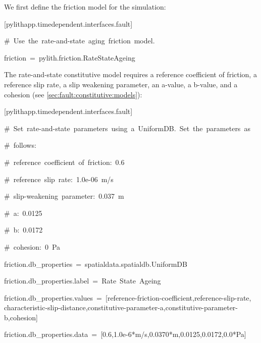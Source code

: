 We first define the friction model for the simulation:
\begin{lyxcode}
{[}pylithapp.timedependent.interfaces.fault{]}

\#~Use~the~rate-and-state~aging~friction~model.

friction~=~pylith.friction.RateStateAgeing
\end{lyxcode}
The rate-and-state constitutive model requires a reference coefficient
of friction, a reference slip rate, a slip weakening parameter, an
a-value, a b-value, and a cohesion (see \ref{sec:fault:constitutive:models}):
\begin{lyxcode}
{\small{}{[}pylithapp.timedependent.interfaces.fault{]}}{\small \par}

{\small{}\#~Set~rate-and-state~parameters~using~a~UniformDB.~Set~the~parameters~as}{\small \par}

{\small{}\#~follows:}{\small \par}

{\small{}\#~reference~coefficient~of~friction:~0.6}{\small \par}

{\small{}\#~reference~slip~rate:~1.0e-06~m/s}{\small \par}

{\small{}\#~slip-weakening~parameter:~0.037~m}{\small \par}

{\small{}\#~a:~0.0125}{\small \par}

{\small{}\#~b:~0.0172}{\small \par}

{\small{}\#~cohesion:~0~Pa}{\small \par}

{\small{}friction.db\_properties~=~spatialdata.spatialdb.UniformDB}{\small \par}

{\small{}friction.db\_properties.label~=~Rate~State~Ageing}{\small \par}

{\small{}friction.db\_properties.values~=~{[}reference-friction-coefficient,reference-slip-rate,}~\\
{\small{}characteristic-slip-distance,constitutive-parameter-a,constitutive-parameter-b,cohesion{]}}{\small \par}

{\small{}friction.db\_properties.data~=~{[}0.6,1.0e-6{*}m/s,0.0370{*}m,0.0125,0.0172,0.0{*}Pa{]}}{\small \par}
\end{lyxcode}
